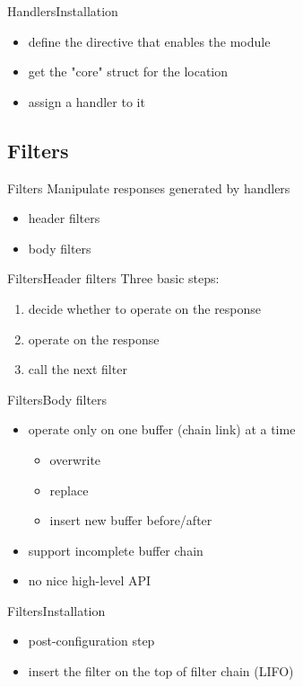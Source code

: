 \documentclass{beamer}
\begin{document}
\begin{frame}{Handlers}{Installation}
\begin{itemize}
 \item define the directive that enables the module
 \item get the "core" struct for the location
 \item assign a handler to it
\end{itemize}
\end{frame}

\subsection{Filters}

\begin{frame}{Filters}
Manipulate responses generated by handlers
\begin{itemize}
 \item header filters
 \item body filters
\end{itemize}
\end{frame}

\begin{frame}{Filters}{Header filters}
Three basic steps:
\begin{enumerate}
\item decide whether to operate on the response
\item operate on the response
\item call the next filter
\end{enumerate}
\end{frame}

\begin{frame}{Filters}{Body filters}
\begin{itemize} 
 \item operate only on one buffer (chain link) at a time
 \begin{itemize}
  \item overwrite
  \item replace
  \item insert new buffer before/after
 \end{itemize}
 \item support incomplete buffer chain
 \item no nice high-level API
\end{itemize}
\end{frame}

\begin{frame}{Filters}{Installation}
\begin{itemize}
 \item post-configuration step
 \item insert the filter on the top of filter chain (LIFO)
\end{itemize}
\end{frame}
\end{document}

